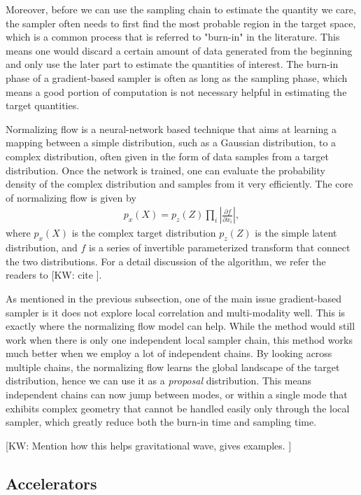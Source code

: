 \documentclass[twocolumn]{aastex631}
\newcommand{\kw}[1]{{\color{rb4}[KW: #1 ]}}
\begin{document}
Moreover, before we can use the sampling chain to estimate the quantity we care,
the sampler often needs to first find the most probable region in the target space,
which is a common process that is referred to "burn-in" in the literature.
This means one would discard a certain amount of data generated from the beginning and only use the later part to estimate the quantities of interest.
The burn-in phase of a gradient-based sampler is often as long as the sampling phase,
which means a good portion of computation is not necessary helpful in estimating the target quantities.

Normalizing flow is a neural-network based technique that aims at learning a
mapping between a simple distribution, such as a Gaussian distribution, to a
complex distribution, often given in the form of data samples from a target
distribution. Once the network is trained, one can evaluate the probability
density of the complex distribution and samples from it very efficiently.
The core of normalizing flow is given by
\begin{align}
    p_x(X) = p_z(Z) \prod_i \left| \frac{\partial f}{\partial x_i}\right|,
\end{align}
where $p_x(X)$ is the complex target distribution $p_z(Z)$ is the simple latent distribution,
and $f$ is a series of invertible parameterized transform that connect the two distributions.
For a detail discussion of the algorithm, we refer the readers to \kw{cite}.

As mentioned in the previous subsection, one of the main issue gradient-based sampler is it does not explore local correlation and multi-modality well.
This is exactly where the normalizing flow model can help.
While the method would still work when there is only one independent local sampler chain, this method works much better when we employ a lot of independent chains.
By looking across multiple chains, the normalizing flow learns the global landscape of the target distribution, hence we can use it as a \textit{proposal} distribution.
This means independent chains can now jump between modes, or within a single mode that exhibits complex geometry that cannot be handled easily only through the local sampler,
which greatly reduce both the burn-in time and sampling time.

\kw{Mention how this helps gravitational wave, gives examples.}


\subsection{Accelerators}
\label{sec:accelerators}
\end{document}
